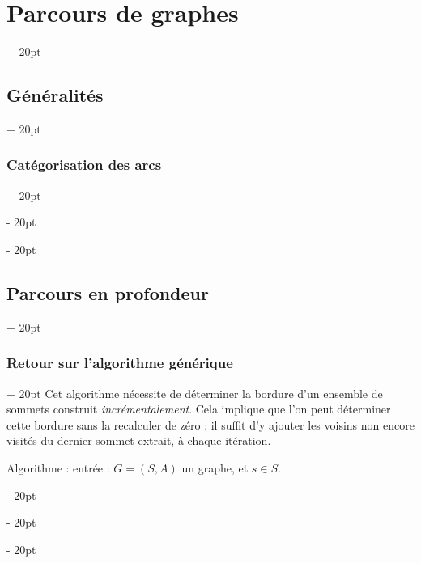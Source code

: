 \documentclass[a4paper, 12pt, twoside]{article}
\newcommand{\ind}[1][20pt]{\advance\leftskip + #1}
\newcommand{\deind}[1][20pt]{\advance\leftskip - #1}
\newenvironment{indt}[2][20pt]{#2 \par \ind[#1]}{\par \deind} %
\begin{document}
\begin{indt}{\section{Parcours de graphes}}
\begin{indt}{\subsection{Généralités}}
\begin{indt}{\subsubsection{Catégorisation des arcs}}
\begin{center}
                \end{center}
            \end{indt}
        \end{indt}

        \vspace{12pt}
        
        \begin{indt}{\subsection{Parcours en profondeur}}
            \begin{indt}{\subsubsection{Retour sur l'algorithme générique}}
                Cet algorithme nécessite de déterminer la bordure d'un ensemble de sommets construit \textit{incrémentalement}. Cela implique que l'on peut déterminer cette bordure sans la recalculer de zéro : il suffit d'y ajouter les voisins non encore visités du dernier sommet extrait, à chaque itération.

                \vspace{12pt}
                
                Algorithme : entrée : $G = (S, A)$ un graphe, et $s \in S$.


\end{indt}
\end{indt}
\end{indt}
\end{document}
